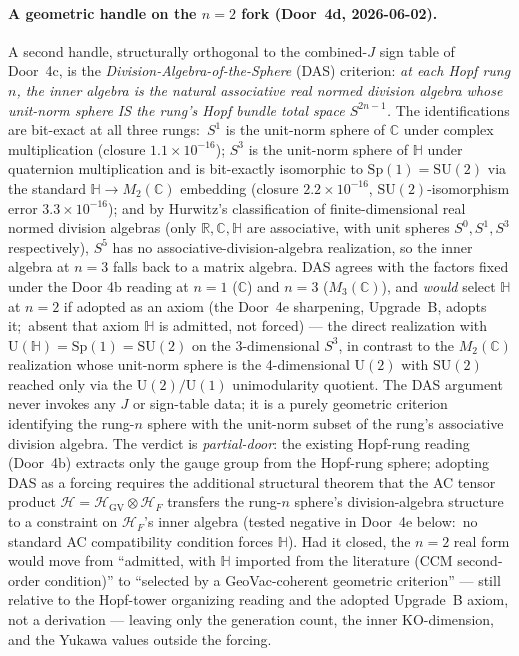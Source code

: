 \documentclass[11pt]{article}
\begin{document}
\paragraph{A geometric handle on the $n=2$ fork (Door~4d, 2026-06-02).}
A second handle, structurally orthogonal to the combined-$J$ sign table
of Door~4c, is the \emph{Division-Algebra-of-the-Sphere} (DAS) criterion:
\emph{at each Hopf rung $n$, the inner algebra is the natural associative
real normed division algebra whose unit-norm sphere IS the rung's Hopf
bundle total space $S^{2n-1}$.} The identifications are bit-exact at
all three rungs:\ $S^1$ is the unit-norm sphere of $\mathbb{C}$ under
complex multiplication (closure $1.1 \times 10^{-16}$); $S^3$ is the
unit-norm sphere of $\mathbb{H}$ under quaternion multiplication and is
bit-exactly isomorphic to $\mathrm{Sp}(1) = \mathrm{SU}(2)$ via the
standard $\mathbb{H} \to M_2(\mathbb{C})$ embedding (closure
$2.2 \times 10^{-16}$, $\mathrm{SU}(2)$-isomorphism error
$3.3 \times 10^{-16}$); and by Hurwitz's classification of finite-dimensional
real normed division algebras (only $\mathbb{R}, \mathbb{C}, \mathbb{H}$
are associative, with unit spheres $S^0, S^1, S^3$ respectively), $S^5$
has no associative-division-algebra realization, so the inner algebra at
$n=3$ falls back to a matrix algebra. DAS agrees with the factors fixed
under the Door 4b reading at $n=1$ ($\mathbb{C}$) and $n=3$ ($M_3(\mathbb{C})$),
and \emph{would} select $\mathbb{H}$ at $n=2$ if adopted as an axiom
(the Door~4e sharpening, Upgrade~B, adopts it;\ absent that axiom
$\mathbb{H}$ is admitted, not forced) --- the
direct realization with $\mathrm{U}(\mathbb{H}) = \mathrm{Sp}(1) =
\mathrm{SU}(2)$ on the 3-dimensional $S^3$, in contrast to the
$M_2(\mathbb{C})$ realization whose unit-norm sphere is the 4-dimensional
$\mathrm{U}(2)$ with $\mathrm{SU}(2)$ reached only via the
$\mathrm{U}(2)/\mathrm{U}(1)$ unimodularity quotient. The DAS argument
never invokes any $J$ or sign-table data; it is a purely geometric
criterion identifying the rung-$n$ sphere with the unit-norm subset of
the rung's associative division algebra. The verdict is
\emph{partial-door}: the existing Hopf-rung reading (Door~4b)
extracts only the gauge group from the Hopf-rung sphere; adopting DAS as a forcing requires the additional
structural theorem that the AC tensor product
$\mathcal{H} = \mathcal{H}_{\mathrm{GV}} \otimes \mathcal{H}_F$ transfers
the rung-$n$ sphere's division-algebra structure to a constraint on
$\mathcal{H}_F$'s inner algebra (tested negative in Door~4e below:\ no
standard AC compatibility condition forces $\mathbb{H}$). Had it
closed, the $n = 2$ real form would move from
``admitted, with $\mathbb{H}$ imported from the literature (CCM
second-order condition)'' to ``selected by a GeoVac-coherent geometric
criterion'' --- still relative to the Hopf-tower organizing reading and
the adopted Upgrade~B axiom, not a derivation --- leaving
only the generation count, the inner KO-dimension, and the Yukawa values
outside the forcing.
\end{document}
